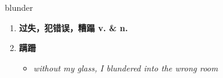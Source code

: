 
\begin{frame}
{\huge blunder}
\begin{center}
\begin{enumerate}\Large
  \item \textbf{过失，犯错误，糟蹋 v. \& n.}
  \item \textbf{蹒跚}
  \begin{itemize}
    \item \em{\Large{without my glass, I blundered into the wrong room}}
  \end{itemize}
\end{enumerate}
\end{center}
\end{frame}
